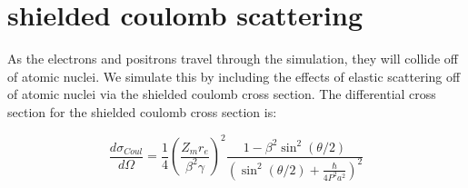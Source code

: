 \documentclass[]{article}
\begin{document}
%
%
%
%
%
%
%


\section{shielded coulomb scattering}

As the electrons and positrons travel through the simulation, they will collide off of atomic nuclei. We simulate this by including the effects of elastic scattering off of atomic nuclei via the shielded coulomb cross section. The differential cross section for the shielded coulomb cross section is:

\begin{equation} 
\frac{d\sigma_{Coul}}{d \Omega} = \frac{1}{4}\left(  \frac{Z_m r_e }{\beta^2 \gamma }  \right)^2\frac{1-\beta^2\sin^2(\theta/2)}{ \left(  \sin^2(\theta/2) + \frac{\hbar}{4P^2a^2}  \right)^2 }
\end{equation}
\end{document}
